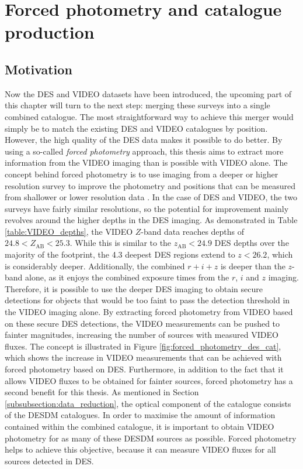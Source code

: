 
\section{Forced photometry and catalogue production}\label{section:forced_photometry}
\subsection{Motivation}\label{subsection:forced_phot_motivation} Now the DES and VIDEO datasets have been introduced, the upcoming part of this chapter will turn to the next step: merging these surveys into a single combined catalogue. The most straightforward way to achieve this merger would simply be to match the existing DES and \cite{2013MNRAS.428.1281J} VIDEO catalogues by position. However, the high quality of the DES data makes it possible to do better. By using a so-called \textit{forced photometry} approach, this thesis aims to extract more information from the VIDEO imaging than is possible with VIDEO alone. The concept behind forced photometry is to use imaging from a deeper or higher resolution survey to improve the photometry and positions that can be measured from shallower or lower resolution data \citep{2015MNRAS.446.2523B, 2016AJ....151...36L}. In the case of DES and VIDEO, the two surveys have fairly similar resolutions, so the potential for improvement mainly revolves around the higher depths in the DES imaging. As demonstrated in Table \ref{table:VIDEO_depths}, the VIDEO $Z$-band data reaches depths of $24.8<Z_{\mathrm{AB}}<25.3$. While this is similar to the $z_{\mathrm{AB}}<24.9$ DES depths over the majority of the \DESVIDEO footprint, the \SI{4.3}{\sqdeg} deepest DES regions extend to $z<26.2$, which is considerably deeper. Additionally, the combined $r+i+z$ is deeper than the $z$-band alone, as it enjoys the combined exposure times from the $r$, $i$ and $z$ imaging. Therefore, it is possible to use the deeper DES imaging to obtain secure detections for objects that would be too faint to pass the detection threshold in the VIDEO imaging alone. By extracting forced photometry from VIDEO based on these secure DES detections, the VIDEO measurements can be pushed to fainter magnitudes, increasing the number of sources with measured VIDEO fluxes. The concept is illustrated in Figure \ref{fig:forced_photometry_des_cat}, which shows the increase in VIDEO measurements that can be achieved with forced photometry based on DES. Furthermore, in addition to the fact that it allows VIDEO fluxes to be obtained for fainter sources, forced photometry has a second benefit for this thesis. As mentioned in Section \ref{subsubsection:data_reduction}, the optical component of the \DESVIDEO catalogue consists of the DESDM catalogues. In order to maximise the amount of information contained within the combined catalogue, it is important to obtain VIDEO photometry for as many of these DESDM sources as possible. Forced photometry helps to achieve this objective, because it can measure VIDEO fluxes for all sources detected in DES. \par  


